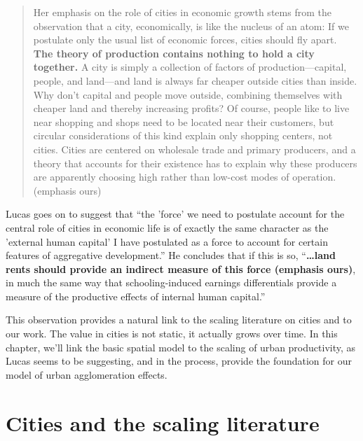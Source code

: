 \begin{quotation}
    Her emphasis on the role of cities in economic growth stems from the observation that a city, economically, is like the nucleus of an atom: If we postulate only the usual list of economic forces, cities should fly apart. \textbf{The theory of production contains nothing to hold a city together.} A city is simply a collection of factors of production---capital, people, and land---and land is always far cheaper outside cities than inside. Why don't capital and people move outside, combining themselves with cheaper land and thereby increasing profits? Of course, people like to live near shopping and shops need to be located near their customers, but circular considerations of this kind explain only shopping centers, not cities. Cities are centered on wholesale trade and primary producers, and a theory that accounts for their existence has to explain why these producers are apparently choosing high rather than low-cost modes of operation. (emphasis ours)
\end{quotation}

Lucas goes on to suggest that ``the 'force' we need to postulate account for the central role of cities in economic life is of exactly the same character as the 'external human capital' I have postulated as a force to account for certain features of aggregative development.''  He concludes that if this is so, ``\textbf{\dots land rents should provide an indirect measure of this force (emphasis  ours)}, in much the same way that schooling-induced earnings differentials provide a measure of the productive effects of internal human capital.''


This observation provides a natural link to the scaling literature on cities and to our work. 
The value in cities is not static, it actually grows over time. In this chapter, we'll link the basic spatial model to the scaling of urban productivity,  as Lucas seems to be suggesting, and in the process,   provide the foundation for our model of urban agglomeration effects.

\section{Cities and the scaling literature}

